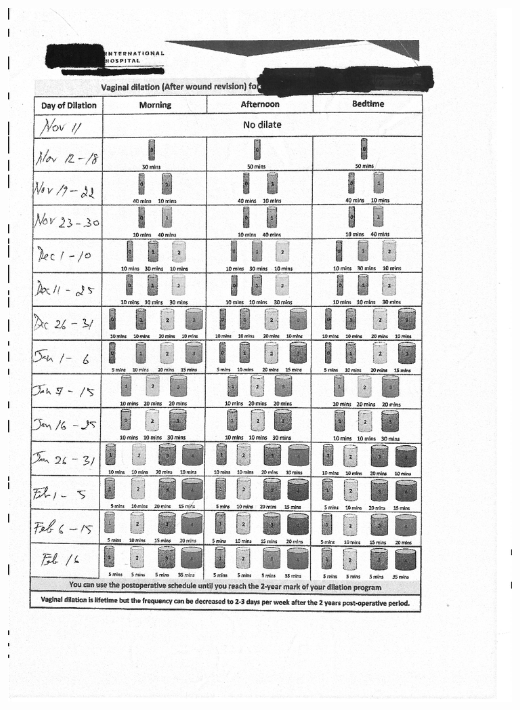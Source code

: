 \documentclass[]{ctexrep}
\begin{document}
	\includegraphics[scale=0.4]{./附件5.1.2.png}
	
\end{document}
